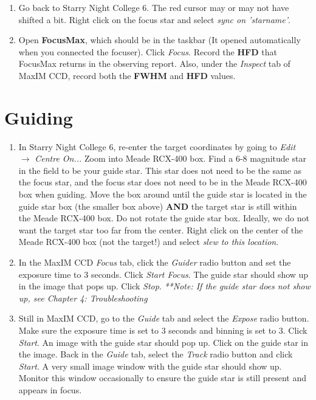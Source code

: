 \documentclass[11pt]{report}
\begin{document}
\begin{enumerate}
\item Go back to Starry Night College 6.  The red cursor may or may not have shifted a bit. Right click on the focus star and select \emph{sync on 'starname'}. 
\item Open {\bf FocusMax}, which should be in the taskbar (It opened automatically when you connected the focuser). Click \emph{Focus}. Record the {\bf HFD} that FocusMax returns in the observing report. Also, under the \emph{Inspect} tab of MaxIM CCD, record both the {\bf FWHM} and {\bf HFD} values. 
\end{enumerate}

\section{Guiding}

\begin{enumerate}
\item In Starry Night College 6, re-enter the target coordinates by going to \emph{Edit} {$\rightarrow$} \emph{Centre On...} Zoom into Meade RCX-400 box. Find a 6-8 magnitude star in the field to be your guide star. This star does not need to be the same as the focus star, and the focus star does not need to be in the Meade RCX-400 box when guiding. Move the box around until the guide star is located in the guide star box (the smaller box above)  {\bf AND} the target star is still within the Meade RCX-400 box. Do not rotate the guide star box. Ideally, we do not want the target star too far from the center. Right click on the center of the Meade RCX-400 box (not the target!) and select \emph{slew to this location}.
\item In the MaxIM CCD \emph{Focus} tab, click the \emph{Guider} radio button and set the exposure time to 3 seconds. Click \emph{Start Focus}. The guide star should show up in the image that pops up. Click \emph{Stop}. \emph{**Note: If the guide star does not show up, see Chapter 4: Troubleshooting}
\item Still in MaxIM CCD, go to the \emph{Guide} tab and select the \emph{Expose} radio button. Make sure the exposure time is set to 3 seconds and binning is set to 3. Click \emph{Start}. An image with the guide star should pop up. Click on the guide star in the image. Back in the \emph{Guide} tab, select the \emph{Track} radio button and click \emph{Start}. A very small image window with the guide star should show up. Monitor this window occasionally to ensure the guide star is still present and appears in focus. 
\end{enumerate}
\end{document}
